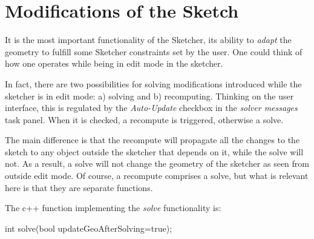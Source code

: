 \documentclass[12pt,twoside,a4paper]{book}
\begin{document}
    \section{Modifications of the Sketch}
    \label{sec:modificationsofthesketch}

    It is the most important functionality of the Sketcher, its ability to \emph{adapt} the geometry to fulfill some Sketcher constraints set by the user. One could think of how one operates while being in edit mode in the sketcher.

    In fact, there are two possibilities for solving modifications introduced while the sketcher is in edit mode: a) solving and b) recomputing. Thinking on the user interface, this is regulated by the \emph{Auto-Update} checkbox in the \emph{solver messages} task panel. When it is checked, a recompute is triggered, otherwise a solve.

    The main difference is that the recompute will propagate all the changes to the sketch to any object outside the sketcher that depends on it, while the solve will not. As a result, a solve will not change the geometry of the sketcher as seen from outside edit mode. Of course, a recompute comprises a solve, but what is relevant here is that they are separate functions.

    The c++ function implementing the \emph{solve} functionality is:

    \begin{codequote}
    int solve(bool updateGeoAfterSolving=true);
    \end{codequote}
\end{document}
